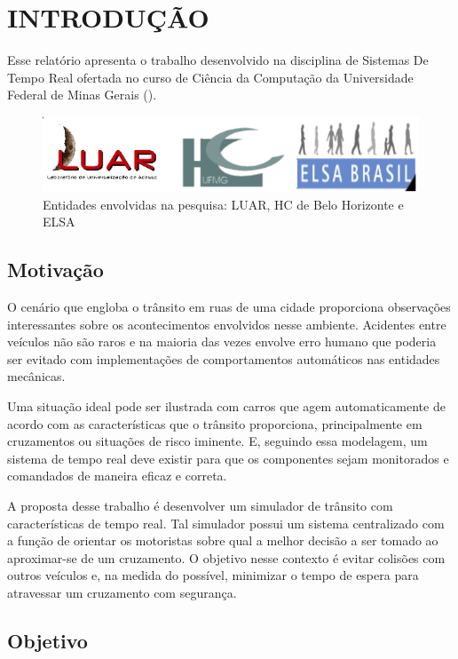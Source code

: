 \chapter{INTRODUÇÃO}

Esse relatório apresenta o trabalho desenvolvido na disciplina de Sistemas De Tempo Real ofertada no curso de Ciência da Computação da Universidade Federal de Minas Gerais ().

\begin{figure}[H]
    \centering
    \includegraphics[scale=0.5,angle=0]{img/LUAR_HC_ELSA.png}
    \caption{Entidades envolvidas na pesquisa: LUAR, HC de Belo Horizonte e ELSA}
    \label{figLUAR_HC_ELSA}
\end{figure}

\section{Motivação}

O cenário que engloba o trânsito em ruas de uma cidade proporciona observações interessantes sobre os acontecimentos envolvidos nesse ambiente. Acidentes entre veículos não são raros e na maioria das vezes envolve erro humano que poderia ser evitado com implementações de comportamentos automáticos nas entidades mecânicas.
 
Uma situação ideal pode ser ilustrada com carros que agem automaticamente de acordo com as características que o trânsito proporciona, principalmente em cruzamentos ou situações de risco iminente. E, seguindo essa modelagem, um sistema de tempo real deve existir para que os componentes sejam monitorados e comandados de maneira eficaz e correta. 

A proposta desse trabalho é desenvolver um simulador de trânsito com características de tempo real. Tal simulador possui um sistema centralizado com a função de orientar os motoristas sobre qual a melhor decisão a ser tomado ao aproximar-se de um cruzamento. O objetivo nesse contexto é evitar colisões com outros veículos e, na medida do possível, minimizar o tempo de espera para atravessar um cruzamento com segurança.

\section{Objetivo}

